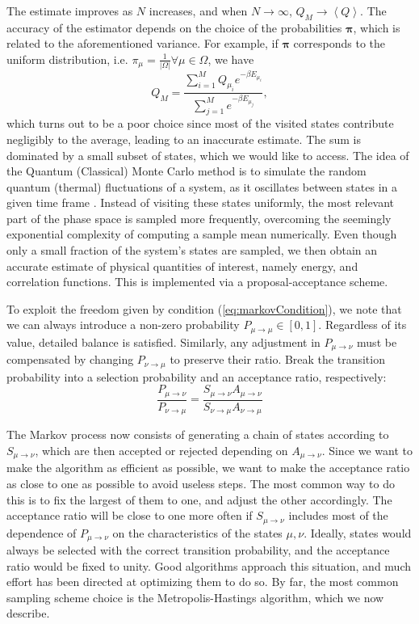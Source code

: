 The estimate improves as $N$ increases, and when $N\rightarrow \infty$, $Q_M \rightarrow \left\langle Q \right\rangle$.
The accuracy of the estimator depends on the choice of the probabilities $\bm \pi$, which is related to the aforementioned variance.
For example, if $\bm \pi$ corresponds to the uniform distribution, i.e. $\pi_\mu = \frac{1}{| \Omega |} \forall \mu \in \Omega$, we have
\begin{equation}
Q_M = \frac{ \sum_{i=1}^M Q_{\mu_i} e^{ -\beta E_{\mu_i} } }{ \sum_{j=1}^M e^{ -\beta E_{\mu_j} }  } ,
\end{equation}
which turns out to be a poor choice since most of the visited states contribute negligibly to the average, leading to an inaccurate estimate.
The sum is dominated by a small subset of states, which we would like to access.
The idea of the Quantum (Classical) Monte Carlo method is to simulate the random quantum (thermal) fluctuations of a system, as it oscillates between states in a given time frame \cite{newman_monte_1999}. Instead of visiting these states uniformly, the most relevant part of the phase space is sampled more frequently, overcoming the seemingly exponential complexity of computing a sample mean numerically.
Even though only a small fraction of the system's states are sampled, we then obtain an accurate estimate of physical quantities of interest, namely energy, and correlation functions. This is implemented via a proposal-acceptance scheme.

To exploit the freedom given by condition (\ref{eq:markovCondition}), we note that we can always introduce a non-zero  probability $P_{\mu \rightarrow \mu} \in [0, 1] $.
Regardless of its value, detailed balance is satisfied.
Similarly, any adjustment in $P_{\mu\rightarrow \nu}$ must be compensated by changing $P_{\nu\rightarrow \mu}$ to preserve their ratio.
Break the transition probability into a selection probability and an acceptance ratio, respectively:
\begin{equation}
\frac{P_{\mu\rightarrow\nu}}{P_{\nu\rightarrow\mu}}= \frac{S_{ \mu\rightarrow\nu} A_{\mu\rightarrow\nu}}{S_{ \nu\rightarrow\mu} A_{\nu\rightarrow\mu}}
\end{equation}

The Markov process now consists of generating a chain of states according to $S_{ \mu\rightarrow\nu}$, which are then accepted or rejected depending on $A_{\mu\rightarrow\nu}$.
Since we want to make the algorithm as efficient as possible, we want to make the acceptance ratio as close to one as possible to avoid useless steps.	
The most common way to do this is to fix the largest of them to one, and adjust the other accordingly.
The acceptance ratio will be close to one more often if $S_{ \mu\rightarrow\nu}$ includes most of the dependence of $P_{\mu\rightarrow\nu}$ on the characteristics of the states $\mu, \nu$.
Ideally, states would always be selected with the correct transition probability, and the acceptance ratio would be fixed to unity.
Good algorithms approach this situation, and much effort has been directed at optimizing them to do so.
By far, the most common sampling scheme choice is the Metropolis-Hastings algorithm, which we now  describe.

